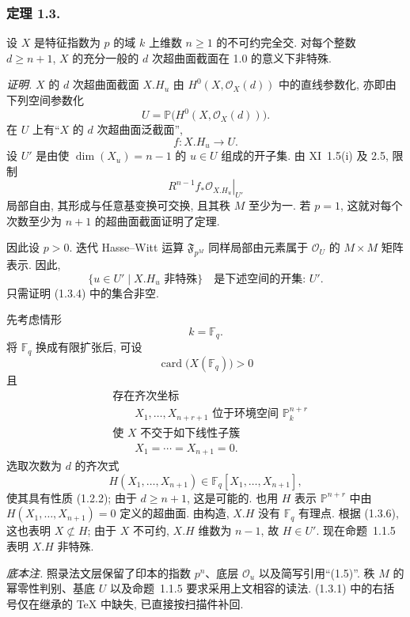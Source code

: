 \subsubsection*{定理 1.3.}
设 $X$ 是特征指数为 $p$ 的域 $k$ 上维数 $n\geq1$ 的不可约完全交.
对每个整数 $d\geq n+1$, $X$ 的充分一般的 $d$ 次超曲面截面在 1.0 的意义下非特殊.

\medskip
\noindent\emph{证明.}
$X$ 的 $d$ 次超曲面截面 $X.H_u$ 由 $H^0(X,\mathcal O_X(d))$ 中的直线参数化,
亦即由下列空间参数化
\begin{equation}\tag{1.3.1}
U=\mathbb P\bigl(H^0(X,\mathcal O_X(d))\bigr).
\end{equation}
在 $U$ 上有“$X$ 的 $d$ 次超曲面泛截面”,
\begin{equation}\tag{1.3.2}
f:X.H_u\longrightarrow U.
\end{equation}
设 $U'$ 是由使 $\dim(X_u)=n-1$ 的 $u\in U$ 组成的开子集.
由 XI~1.5(i) 及 2.5, 限制
\begin{equation}\tag{1.3.3}
\left.R^{n-1}f_*\mathcal O_{X.H_u}\right|_{U'}
\end{equation}
局部自由, 其形成与任意基变换可交换, 且其秩 $M$ 至少为一.
若 $p=1$, 这就对每个次数至少为 $n+1$ 的超曲面截面证明了定理.

因此设 $p>0$. 迭代 Hasse--Witt 运算 $\mathfrak F_{p^M}$ 同样局部由元素属于
$\mathcal O_U$ 的 $M\times M$ 矩阵表示. 因此,
\begin{equation}\tag{1.3.4}
\{u\in U'\mid X.H_u\text{ 非特殊}\}
\quad\text{是下述空间的开集: }U'.
\end{equation}
只需证明 (1.3.4) 中的集合非空.

先考虑情形
\begin{equation}\tag{1.3.5}
k=\mathbb F_q.
\end{equation}
将 $\mathbb F_q$ 换成有限扩张后, 可设
\begin{equation}\tag{1.3.6}
\operatorname{card}\bigl(X(\mathbb F_q)\bigr)>0
\end{equation}
且
\begin{equation}\tag{1.3.7}
\begin{aligned}
&\text{存在齐次坐标}\\
&\qquad X_1,\dots,X_{n+r+1}\text{ 位于环境空间 }\mathbb P_k^{n+r}\\
&\text{使 }X\text{ 不交于如下线性子簇}\\
&\qquad X_1=\cdots=X_{n+1}=0.
\end{aligned}
\end{equation}
选取次数为 $d$ 的齐次式
\begin{equation}\tag{1.3.8}
H(X_1,\dots,X_{n+1})\in
\mathbb F_q[X_1,\dots,X_{n+1}],
\end{equation}
使其具有性质 (1.2.2); 由于 $d\geq n+1$, 这是可能的.
也用 $H$ 表示 $\mathbb P^{n+r}$ 中由 $H(X_1,\dots,X_{n+1})=0$ 定义的超曲面.
由构造, $X.H$ 没有 $\mathbb F_q$ 有理点. 根据 (1.3.6), 这也表明 $X\not\subset H$;
由于 $X$ 不可约, $X.H$ 维数为 $n-1$, 故 $H\in U'$.
现在命题~1.1.5 表明 $X.H$ 非特殊.

\medskip
\noindent\emph{底本注.}
照录法文层保留了印本的指数 $p^n$、底层 $\mathcal O_u$ 以及简写引用“(1.5)”.
秩 $M$ 的幂零性判别、基底 $U$ 以及命题~1.1.5 要求采用上文相容的读法.
(1.3.1) 中的右括号仅在继承的 TeX 中缺失, 已直接按扫描件补回.
